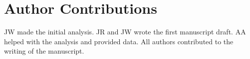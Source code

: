 \section{Author Contributions}
JW made the initial analysis. JR and JW wrote the first manuscript draft. AA helped with the analysis and provided data. All authors contributed to the writing of the manuscript.